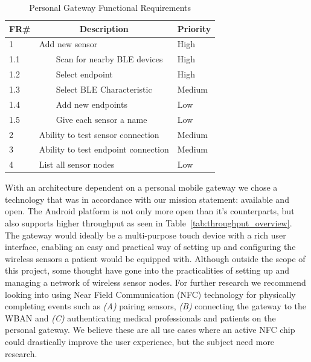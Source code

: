 \begin{table}[]
\centering
\caption{Personal Gateway Functional Requirements}
\label{tab:gatewayRequirements}
\begin{tabular}{|l|l|l|}
\hline
\textbf{FR\#} & \multicolumn{1}{c|}{\textbf{Description}} & \multicolumn{1}{c|}{\textbf{Priority}} \\ \hline
1             & Add new sensor                            & High                                   \\ \hline
1.1           & \ \ \ \ Scan for nearby BLE devices               & High                                   \\ \hline
1.2           & \ \ \ \ Select endpoint                           & High                                   \\ \hline
1.3           & \ \ \ \ Select BLE Characteristic                 & Medium                                 \\ \hline
1.4           & \ \ \ \ Add new endpoints                         & Low                                 \\ \hline
1.5           & \ \ \ \ Give each sensor a name                   & Low                                    \\ \hline
2             & Ability to test sensor connection         & Medium                                 \\ \hline
3             & Ability  to test endpoint connection      & Medium                                 \\ \hline
4             & List all sensor nodes                     & Low                                    \\ \hline
\end{tabular}
\end{table}

With an architecture dependent on a personal mobile gateway we chose a technology that was in accordance with our mission statement: available and open. The Android platform is not only more open than it's counterparts, but also supports higher throughput as seen in Table~\ref{tab:throughput_overview}.
The gateway would ideally be a multi-purpose touch device with a rich user interface, enabling an easy and practical way of setting up and configuring the wireless sensors a patient would be equipped with. Although outside the scope of this project, some thought have gone into the practicalities of setting up and managing a network of wireless sensor nodes. For further research we recommend looking into using Near Field Communication (NFC) technology for physically completing events such as \emph{(A)} pairing sensors, \emph{(B)} connecting the gateway to the WBAN and \emph{(C)} authenticating medical professionals and patients on the personal gateway. We believe these are all use cases where an active NFC chip could drastically improve the user experience, but the subject need more research.

